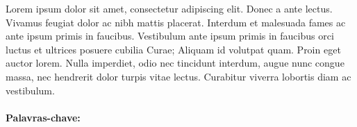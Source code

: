 \begin{singlespace}

\noindent Lorem ipsum dolor sit amet, consectetur adipiscing elit. Donec a ante lectus. Vivamus feugiat dolor ac nibh mattis placerat. Interdum et malesuada fames ac ante ipsum primis in faucibus. Vestibulum ante ipsum primis in faucibus orci luctus et ultrices posuere cubilia Curae; Aliquam id volutpat quam. Proin eget auctor lorem. Nulla imperdiet, odio nec tincidunt interdum, augue nunc congue massa, nec hendrerit dolor turpis vitae lectus. Curabitur viverra lobortis diam ac vestibulum.\\\\
\textbf{Palavras-chave:} \textsf{\palavrasChave}
\end{singlespace}